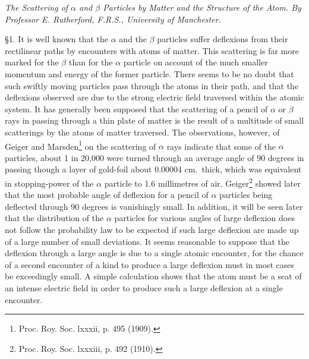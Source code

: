 \documentclass{article}
\begin{document}
{\it The Scattering of $\alpha$ and $\beta$ Particles by Matter and the Structure of the Atom.
By Professor E. Rutherford, F.R.S.,
University of Manchester.}

\bigskip
\S 1. It is well known that the $\alpha$ and the $\beta$ particles suffer
deflexions from their rectilinear paths by encounters with atoms of matter.
This scattering is far more marked for the $\beta$ than for the $\alpha$
particle on account of the much smaller momentum and energy of the former
particle. There seems to be no doubt that such swiftly moving particles pass
through the atoms in their path, and that the deflexions observed are due to
the strong electric field traversed within the atomic system.
It has generally been supposed that the scattering of a pencil of $\alpha$
or $\beta$ rays in passing through a thin plate of matter is the result of a
multitude of small scatterings by the atoms of matter traversed.
The observations, however, of Geiger and Marsden\footnote{Proc. Roy. Soc. lxxxii, p. 495 (1909).}
on the scattering of
$\alpha$ rays indicate that some of the $\alpha$ particles,
about 1 in 20,000 were turned through an average angle of 90 degrees in
passing though a layer of gold-foil about 0.00004 cm.~thick,
which was equivalent in stopping-power of the $\alpha$ particle to
1.6 millimetres of air.
Geiger\footnote{Proc. Roy. Soc. lxxxiii, p. 492 (1910).}
showed later that the most probable angle of deflexion for a
pencil of $\alpha$ particles being deflected through 90 degrees is
vanishingly small.
In addition, it will be seen later that the distribution of the $\alpha$
particles for various angles of large deflexion does not follow the
probability law to be expected if such large deflexion are made up of a
large number of small deviations.
It seems reasonable to suppose that the deflexion through a large angle is
due to a single atomic encounter, for the chance of a second encounter of a
kind to produce a large deflexion must in most cases be exceedingly small.
A simple calculation shows that the atom must be a seat of an intense electric
field in order to produce such a large deflexion at a single encounter.
\end{document}
